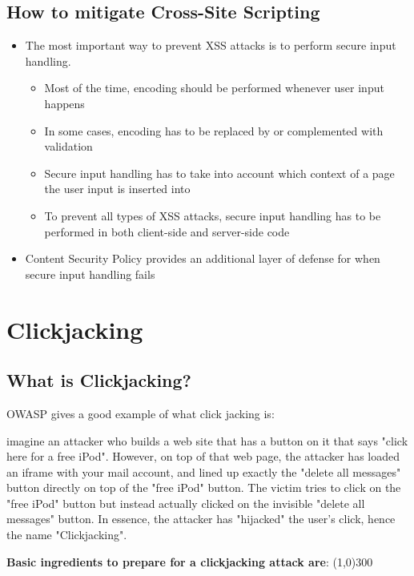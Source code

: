 \documentclass[a4paper, titlepage]{article}
\begin{document}
\subsection{How to mitigate Cross-Site Scripting}
\begin{itemize}
    \item The most important way to prevent XSS attacks is to perform secure input handling.
        \begin{itemize}
            \item Most of the time, encoding should be performed whenever user input happens
            \item In some cases, encoding has to be replaced by or complemented with validation
            \item Secure input handling has to take into account which context of a page the user input is inserted into
            \item To prevent all types of XSS attacks, secure input handling has to be performed in both client-side and server-side code
        \end{itemize}
    \item Content Security Policy provides an additional layer of defense for when secure input handling fails
\end{itemize}
\newpage

\section{Clickjacking}
\subsection{What is Clickjacking?}
OWASP gives a good example of what click jacking is:

imagine an attacker who builds a web site that has a button on it that says "click here for a free iPod". However, on top of that web page, the attacker has loaded an iframe with your mail account, and lined up exactly the "delete all messages" button directly on top of the "free iPod" button. The victim tries to click on the "free iPod" button but instead actually clicked on the invisible "delete all messages" button. In essence, the attacker has "hijacked" the user's click, hence the name "Clickjacking".  \newline

\textbf{Basic ingredients to prepare for a clickjacking attack are}: \newline
\line(1,0){300} \\
\end{document}
